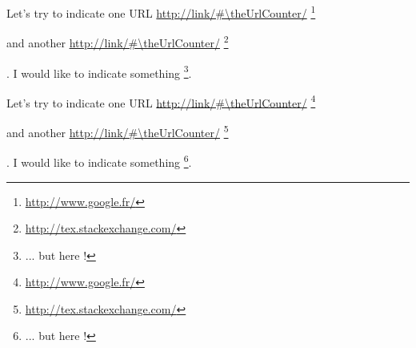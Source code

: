 \documentclass[10pt]{article}
\newcounter{UrlCounter}
\newcommand{\myUrl}[1]{%
		\textcolor{blue}{\url{http://link/\#\theUrlCounter/}} \footnote{\url{#1}} %
		\addtocounter{UrlCounter}{1}%
	}
\begin{document}
Let's try to indicate one URL \myUrl{http://www.google.fr/}
and another \myUrl{http://tex.stackexchange.com/}.
I would like to indicate something \footnote{... but here !}.

\lipsum

Let's try to indicate one URL \myUrl{http://www.google.fr/}
and another \myUrl{http://tex.stackexchange.com/}.
I would like to indicate something \footnote{... but here !}.
\end{document}
